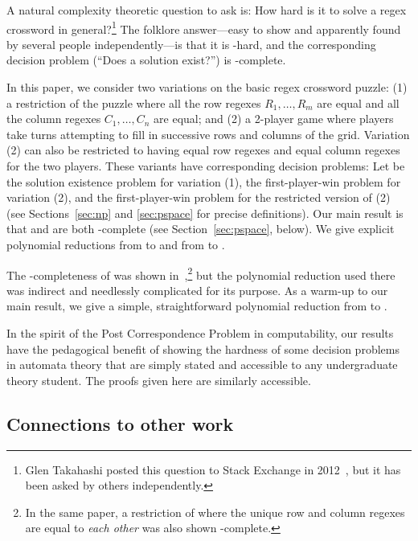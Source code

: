 \documentclass{article}
\newcommand{\0}{\mathbf{0}}
\newcommand{\1}{\mathbf{1}}
\newcommand{\2}{\mathbf{2}}
\newcounter{row}
\newcounter{col}
\theoremstyle{plain}
\theoremstyle{definition}
\begin{document}
A natural complexity theoretic question to ask is: How hard is it to solve a regex crossword in general?\footnote{Glen Takahashi posted this question to Stack Exchange in 2012~\cite{Takahashi:regex-crossword}, but it has been asked by others independently.}  The folklore answer---easy to show and apparently found by several people independently---is that it is -hard, and the corresponding decision problem (``Does a solution exist?'') is -complete.

In this paper, we consider two variations on the basic regex crossword puzzle: (1) a restriction of the puzzle where all the row regexes $R_1,\ldots,R_m$ are equal and all the column regexes $C_1,\ldots,C_n$ are equal; and (2) a 2-player game where players take turns attempting to fill in successive rows and columns of the grid.  Variation (2) can also be restricted to having equal row regexes and equal column regexes for the two players.  These variants have corresponding decision problems:  Let  be the solution existence problem for variation (1),  the first-player-win problem for variation (2), and  the first-player-win problem for the restricted version of (2) (see Sections~\ref{sec:np} and \ref{sec:pspace} for precise definitions).  Our main result is that  and  are both -complete (see Section~\ref{sec:pspace}, below).  We give explicit polynomial reductions from  to  and from  to .

The -completeness of  was shown in~\cite{Fenner:regex-crossword},\footnote{In the same paper, a restriction of  where the unique row and column regexes are equal to \emph{each other} was also shown -complete.} but the polynomial reduction used there was indirect and needlessly complicated for its purpose.  As a warm-up to our main result, we give a simple, straightforward polynomial reduction from  to .

In the spirit of the Post Correspondence Problem in computability, our results have the pedagogical benefit of showing the hardness of some decision problems in automata theory that are simply stated and accessible to any undergraduate theory student.  The proofs given here are similarly accessible.

\subsection{Connections to other work}
\end{document}
